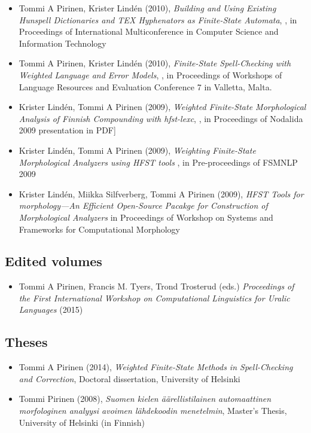 \documentclass[a4paper]{article}
\begin{document}
\begin{itemize}
\item Tommi A Pirinen, Krister Lindén (2010), \textit{Building and Using Existing Hunspell Dictionaries and TEX Hyphenators as Finite-State Automata}, , in Proceedings of International Multiconference in Computer Science and Information Technology
\item Tommi A Pirinen, Krister Lindén (2010), \textit{Finite-State Spell-Checking with Weighted Language and Error Models}, , in Proceedings of Workshops of Language Resources and Evaluation Conference 7 in Valletta, Malta.
\item Krister Lindén, Tommi A Pirinen (2009), \textit{Weighted Finite-State Morphological Analysis of Finnish Compounding with hfst-lexc}, , in Proceedings of Nodalida 2009 presentation in PDF]
\item Krister Lindén, Tommi A Pirinen (2009), \textit{Weighting Finite-State Morphological Analyzers using HFST tools} , in Pre-proceedings of FSMNLP 2009
\item Krister Lindén, Miikka Silfverberg, Tommi A Pirinen (2009), \textit{HFST Tools for morphology—An Efficient Open-Source Pacakge for Construction of Morphological Analyzers} in Proceedings of Workshop on Systems and Frameworks for Computational Morphology
\end{itemize}


\subsection{Edited volumes}

\begin{itemize}
\item Tommi A Pirinen, Francis M. Tyers, Trond Trosterud (eds.) \textit{Proceedings of the First International Workshop on Computational Linguistics for Uralic Languages} (2015)
\end{itemize}

\subsection{Theses}

\begin{itemize}
\item Tommi A Pirinen (2014), \textit{Weighted Finite-State Methods in Spell-Checking and Correction}, Doctoral dissertation, University of Helsinki
\item Tommi Pirinen (2008), \textit{Suomen kielen äärellistilainen automaattinen morfologinen analyysi avoimen lähdekoodin menetelmin}, Master's Thesis, University of Helsinki (in Finnish)
\end{itemize}
\end{document}
